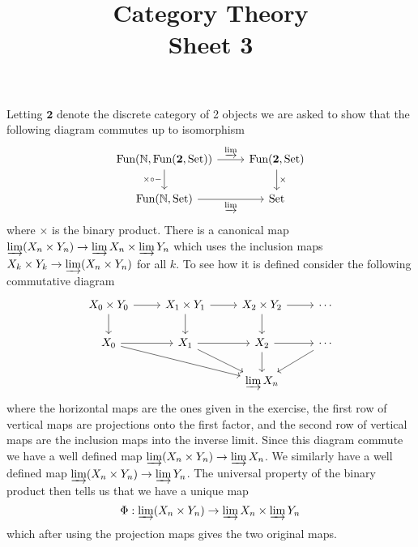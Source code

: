 \documentclass[a4paper]{article}
\title{Category Theory \\ Sheet 3}
\begin{document}
\maketitle
\begin{exercise}{2}
Letting $ \mathbf{2} $ denote the discrete category of 2 objects we are asked to show that the following diagram commutes up to isomorphism
\[\begin{tikzcd}
	{\text{Fun}(\mathbb{N}, \text{Fun}(\mathbf{2}, \text{Set}))} & {\text{Fun}(\mathbf{2}, \text{Set})} \\
	{\text{Fun}(\mathbb{N}, \text{Set})} & {\text{Set}}
	\arrow["\times\circ -"', from=1-1, to=2-1]
	\arrow["\varinjlim", from=1-1, to=1-2]
	\arrow["\times", from=1-2, to=2-2]
	\arrow["\varinjlim"', from=2-1, to=2-2]
\end{tikzcd}\]
where $ \times $ is the binary product. There is a canonical map $ \varinjlim (X_n \times Y_n) \to \varinjlim X_n \times \varinjlim Y_n $ which uses the inclusion maps $ X_k \times Y_k \to \varinjlim(X_n \times Y_n) $ for all $ k $. To see how it is defined consider the following commutative diagram
\[\begin{tikzcd}
	{X_0 \times Y_0} & {X_1 \times Y_1} & {X_2 \times Y_2} & \cdots \\
	{X_0} & {X_1} & {X_2} & \cdots \\
	&& {\varinjlim X_n}
	\arrow[from=1-1, to=1-2]
	\arrow[from=1-1, to=2-1]
	\arrow[from=2-1, to=2-2]
	\arrow[from=2-2, to=2-3]
	\arrow[from=1-2, to=1-3]
	\arrow[from=1-2, to=2-2]
	\arrow[from=1-3, to=2-3]
	\arrow[from=1-3, to=1-4]
	\arrow[from=2-3, to=2-4]
	\arrow[from=2-1, to=3-3]
	\arrow[from=2-2, to=3-3]
	\arrow[from=2-3, to=3-3]
	\arrow[from=2-4, to=3-3]
\end{tikzcd}\]
where the horizontal maps are the ones given in the exercise, the first row of vertical maps are projections onto the first factor, and the second row of vertical maps are the inclusion maps into the inverse limit. Since this diagram commute we have a well defined map $ \varinjlim( X_n \times Y_n) \to \varinjlim X_n $. We similarly have a well defined map $ \varinjlim( X_n \times Y_n) \to \varinjlim Y_n $. The universal property of the binary product then tells us that we have a unique map
\begin{equation*}
\Phi: \varinjlim( X_n \times Y_n) \to \varinjlim X_n \times \varinjlim Y_n
\end{equation*}
which after using the projection maps gives the two original maps.


\end{exercise}
\end{document}
